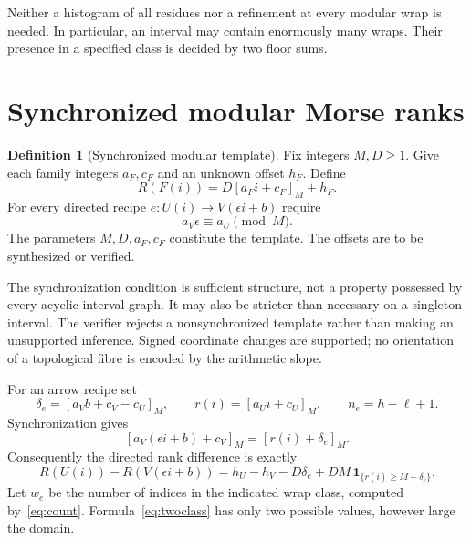 \documentclass[11pt,letterpaper]{article}
\theoremstyle{definition}
\newtheorem{definition}[theorem]{Definition}
\theoremstyle{remark}\newtheorem{remark}[theorem]{Remark}
\newcommand{\res}[2]{\left[#1\right]_{#2}}
\begin{document}
Neither a histogram of all residues nor a refinement at every modular wrap is needed. In particular, an interval may contain enormously many wraps. Their presence in a specified class is decided by two floor sums.

\section{Synchronized modular Morse ranks}
\label{sec:modular}

\begin{definition}[Synchronized modular template]
Fix integers $M,D\geq1$. Give each family integers $a_F,c_F$ and an unknown offset $h_F$. Define
\begin{equation}
             R(F(i))=D\res{a_F i+c_F}{M}+h_F.
 \label{eq:modrank}
\end{equation}
For every directed recipe $e:U(i)\to V(\epsilon i+b)$ require
\begin{equation}
                           a_V\epsilon\equiv a_U\pmod M.
 \label{eq:synch}
\end{equation}
The parameters $M,D,a_F,c_F$ constitute the template. The offsets are to be synthesized or verified.
\end{definition}

The synchronization condition is sufficient structure, not a property possessed by every acyclic interval graph. It may also be stricter than necessary on a singleton interval. The verifier rejects a nonsynchronized template rather than making an unsupported inference. Signed coordinate changes are supported; no orientation of a topological fibre is encoded by the arithmetic slope.

For an arrow recipe set
\[
       \delta_e=\res{a_Vb+c_V-c_U}{M},\qquad
       r(i)=\res{a_Ui+c_U}{M},\qquad n_e=h-\ell+1.
\]
Synchronization gives
\[
 \res{a_V(\epsilon i+b)+c_V}{M}
        =\res{r(i)+\delta_e}{M}.
\]
Consequently the directed rank difference is exactly
\begin{equation}
 R(U(i))-R(V(\epsilon i+b))
 =h_U-h_V-D\delta_e
       +DM\,\mathbf 1_{\{r(i)\geq M-\delta_e\}}.
 \label{eq:twoclass}
\end{equation}
Let $w_e$ be the number of indices in the indicated wrap class, computed by~\eqref{eq:count}. Formula~\eqref{eq:twoclass} has only two possible values, however large the domain.
\end{document}
